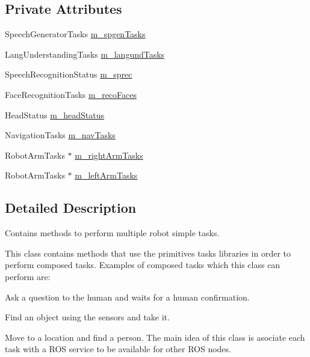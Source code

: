 \subsection*{Private Attributes}
\begin{DoxyCompactItemize}
\item 
Speech\+Generator\+Tasks \hyperlink{class_simple_tasks_a6f47514f5e71977a2ff123311ad3dec2}{m\+\_\+spgen\+Tasks}
\item 
Lang\+Understanding\+Tasks \hyperlink{class_simple_tasks_a4cf498d52ac2f3f0cf8eff17688a876d}{m\+\_\+langund\+Tasks}
\item 
Speech\+Recognition\+Status \hyperlink{class_simple_tasks_a1459e7794f0b070486266456dbbc89c5}{m\+\_\+sprec}
\item 
Face\+Recognition\+Tasks \hyperlink{class_simple_tasks_a7fb0ede1319b6a8acc7b4e733e494f40}{m\+\_\+reco\+Faces}
\item 
Head\+Status \hyperlink{class_simple_tasks_ad01bd034086c0ff10994e0afae9a3398}{m\+\_\+head\+Status}
\item 
Navigation\+Tasks \hyperlink{class_simple_tasks_a187c187f5b0ca367535f506b6029f405}{m\+\_\+nav\+Tasks}
\item 
Robot\+Arm\+Tasks $\ast$ \hyperlink{class_simple_tasks_a0c9ef13ebff2b2ca0ff6dbd6aa5d641b}{m\+\_\+right\+Arm\+Tasks}
\item 
Robot\+Arm\+Tasks $\ast$ \hyperlink{class_simple_tasks_ab3c7f040efb90602dda3167136ce15a5}{m\+\_\+left\+Arm\+Tasks}
\end{DoxyCompactItemize}


\subsection{Detailed Description}
Contains methods to perform multiple robot simple tasks. 

This class contains methods that use the primitives tasks libraries in order to perform composed tasks. Examples of composed tasks which this class can perform are\+:
\begin{DoxyItemize}
\item Ask a question to the human and waits for a human confirmation.
\item Find an object using the sensors and take it.
\item Move to a location and find a person. The main idea of this class is asociate each task with a R\+OS service to be available for other R\+OS nodes.
\end{DoxyItemize}

